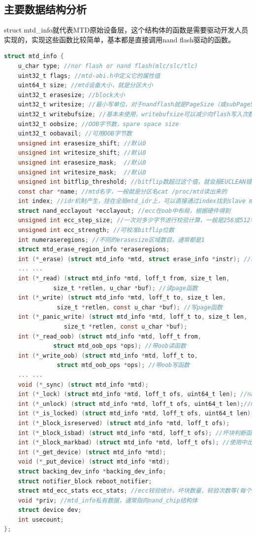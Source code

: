 \subsection{主要数据结构分析}
struct mtd\_info就代表MTD原始设备层，这个结构体的函数是需要驱动开发人员实现的，实现这些函数比较简单，基本都是直接调用nand flash驱动的函数。
\begin{lstlisting}[language=C]
struct mtd_info {
	u_char type; //nor flash or nand flash(mlc/slc/tlc)
	uint32_t flags; //mtd-abi.h中定义它的属性值
	uint64_t size; //mtd设备大小，就是分区大小
	uint32_t erasesize; //block大小
	uint32_t writesize; //最小写单位，对于nandflash就是PageSize（或subPageSize）
	uint32_t writebufsize; //基本未使用，writebufsize可以减少向flash写入次数
	uint32_t oobsize; //OOB字节数，spare space size
	uint32_t oobavail; //可用OOB字节数
	unsigned int erasesize_shift; //默认0
	unsigned int writesize_shift; //默认0
	unsigned int erasesize_mask;  //默认0
	unsigned int writesize_mask;  //默认0
	unsigned int bitflip_threshold; //bitflip数超过这个值，就会报EUCLEAN错误，这个值可以通过sysfs修改
	const char *name; //mtd名字，一般就是分区名cat /proc/mtd读出来的
	int index; //idr机制产生，挂在全局mtd_idr上，可以直接通过index找到slave mtd_info(后面用到)
	struct nand_ecclayout *ecclayout; //ecc在oob中布局，根据硬件得到
	unsigned int ecc_step_size; //一次对多少字节进行校验计算，一般是256或512字节
	unsigned int ecc_strength; //可校准bitflip位数
	int numeraseregions; //不同的erasesize区域数目，通常都是1
	struct mtd_erase_region_info *eraseregions;
	int (*_erase) (struct mtd_info *mtd, struct erase_info *instr); //块擦除函数，实现时会跳坏块
	... ...
	int (*_read) (struct mtd_info *mtd, loff_t from, size_t len,
		      size_t *retlen, u_char *buf); //读page函数
	int (*_write) (struct mtd_info *mtd, loff_t to, size_t len,
		       size_t *retlen, const u_char *buf); //写page函数
	int (*_panic_write) (struct mtd_info *mtd, loff_t to, size_t len,
			     size_t *retlen, const u_char *buf);
	int (*_read_oob) (struct mtd_info *mtd, loff_t from,
			  struct mtd_oob_ops *ops); //带oob读函数
	int (*_write_oob) (struct mtd_info *mtd, loff_t to,
			   struct mtd_oob_ops *ops); //带oob写函数
	... ...
	void (*_sync) (struct mtd_info *mtd);
	int (*_lock) (struct mtd_info *mtd, loff_t ofs, uint64_t len); //nandflash支持设备独占访问时定义
	int (*_unlock) (struct mtd_info *mtd, loff_t ofs, uint64_t len);//nandflash解锁
	int (*_is_locked) (struct mtd_info *mtd, loff_t ofs, uint64_t len);
	int (*_block_isreserved) (struct mtd_info *mtd, loff_t ofs);
	int (*_block_isbad) (struct mtd_info *mtd, loff_t ofs); //坏块判断函数
	int (*_block_markbad) (struct mtd_info *mtd, loff_t ofs); //使用中出现坏块时的标记函数
	int (*_get_device) (struct mtd_info *mtd);
	void (*_put_device) (struct mtd_info *mtd);
	struct backing_dev_info *backing_dev_info;
	struct notifier_block reboot_notifier;
	struct mtd_ecc_stats ecc_stats; //ecc较验统计，坏块数量，较验次数等(每个分区独立统计)
	void *priv; //mtd_info私有数据，通常指向nand_chip结构体
	struct device dev;
	int usecount;
};

\end{lstlisting}

